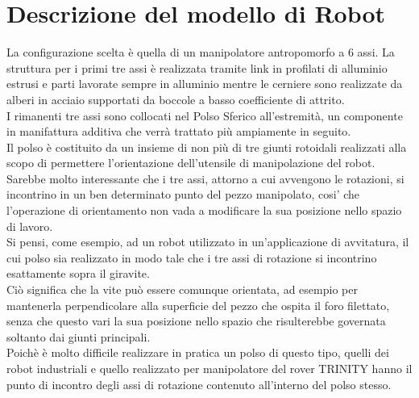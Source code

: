 \documentclass[%
corpo=11pt,
twoside,
 stile=classica,
oldstyle,
greek,%
]{toptesi}
\begin{document}
\section{Descrizione del modello di Robot}
La configurazione scelta è quella di un manipolatore antropomorfo a 6 assi. La struttura per i primi tre assi è realizzata tramite link in profilati di alluminio estrusi e parti lavorate sempre in alluminio mentre le cerniere sono realizzate da alberi in acciaio supportati da boccole a basso coefficiente di attrito. \\
I rimanenti tre assi sono collocati nel Polso Sferico all'estremità, un componente in manifattura additiva che verrà trattato più ampiamente in seguito. \\
Il polso è costituito da un insieme di non più di tre giunti rotoidali realizzati alla scopo di permettere l'orientazione dell'utensile di manipolazione del robot. \\
Sarebbe molto interessante che i tre assi, attorno a cui avvengono le rotazioni, si incontrino in un ben determinato punto del pezzo manipolato, cosi' che l'operazione di orientamento non vada a modificare la sua posizione nello spazio di lavoro. \\
Si pensi, come esempio, ad un robot utilizzato in un'applicazione di avvitatura, il cui polso sia realizzato in modo tale che i tre assi di rotazione si incontrino esattamente sopra il giravite.\\
 Ciò significa che la vite può essere comunque orientata, ad esempio per mantenerla perpendicolare alla superficie del pezzo che ospita il foro filettato, senza che questo vari la sua posizione nello spazio che risulterebbe governata soltanto dai giunti principali. \\
 Poichè è molto difficile realizzare in pratica un polso di questo tipo, quelli dei robot industriali e quello realizzato per manipolatore del rover TRINITY hanno il punto di incontro degli assi di rotazione contenuto all'interno del polso stesso.
\end{document}
